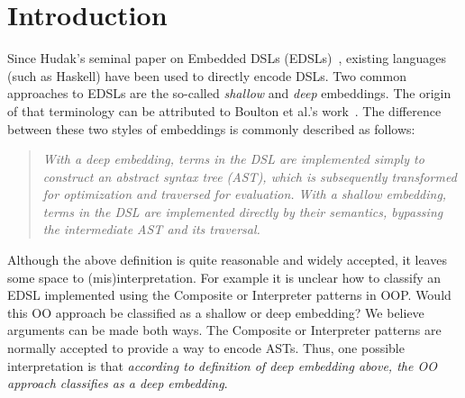 \section{Introduction}

Since Hudak's seminal paper on Embedded DSLs (EDSLs)~\cite{hudak1998modular}, existing
languages (such as Haskell) have been used to directly encode
DSLs. Two common approaches to EDSLs are the so-called \emph{shallow}
and \emph{deep} embeddings. The origin of that terminology can be
attributed to Boulton et al.'s work~\cite{Boulton92dsl}. The difference between these
two styles of embeddings is commonly described as follows:

\begin{quote}
\emph{With a deep embedding, terms in the DSL are implemented simply to
construct an abstract syntax tree (AST), which is subsequently
transformed for optimization and traversed for evaluation. With a
shallow embedding, terms in the DSL are implemented directly by
their semantics, bypassing the intermediate AST and its traversal.}\cite{gibbons2014folding}
\end{quote}


Although the above definition is quite reasonable and widely accepted,
it leaves some space to (mis)interpretation. For example it is unclear 
how to classify an EDSL implemented using the {\sc Composite} or {\sc Interpreter} 
patterns in OOP. Would this OO approach be
classified as a shallow or deep embedding? We believe arguments can be
made both ways. The {\sc Composite} or {\sc Interpreter}
patterns are normally accepted to provide a way to encode ASTs. Thus, 
one possible interpretation is that \emph{according to definition of deep embedding
  above, the OO approach classifies as a deep
  embedding}. 

